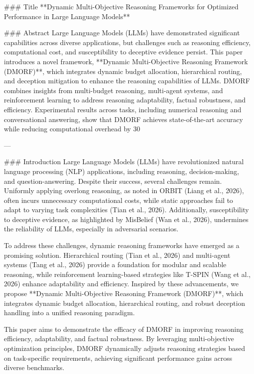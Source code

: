 ### Title
**Dynamic Multi-Objective Reasoning Frameworks for Optimized Performance in Large Language Models**

### Abstract
Large Language Models (LLMs) have demonstrated significant capabilities across diverse applications, but challenges such as reasoning efficiency, computational cost, and susceptibility to deceptive evidence persist. This paper introduces a novel framework, **Dynamic Multi-Objective Reasoning Framework (DMORF)**, which integrates dynamic budget allocation, hierarchical routing, and deception mitigation to enhance the reasoning capabilities of LLMs. DMORF combines insights from multi-budget reasoning, multi-agent systems, and reinforcement learning to address reasoning adaptability, factual robustness, and efficiency. Experimental results across tasks, including numerical reasoning and conversational answering, show that DMORF achieves state-of-the-art accuracy while reducing computational overhead by 30%

---

### Introduction
Large Language Models (LLMs) have revolutionized natural language processing (NLP) applications, including reasoning, decision-making, and question-answering. Despite their success, several challenges remain. Uniformly applying overlong reasoning, as noted in ORBIT (Liang et al., 2026), often incurs unnecessary computational costs, while static approaches fail to adapt to varying task complexities (Tian et al., 2026). Additionally, susceptibility to deceptive evidence, as highlighted by MisBelief (Wan et al., 2026), undermines the reliability of LLMs, especially in adversarial scenarios.

To address these challenges, dynamic reasoning frameworks have emerged as a promising solution. Hierarchical routing (Tian et al., 2026) and multi-agent systems (Tang et al., 2026) provide a foundation for modular and scalable reasoning, while reinforcement learning-based strategies like T-SPIN (Wang et al., 2026) enhance adaptability and efficiency. Inspired by these advancements, we propose **Dynamic Multi-Objective Reasoning Framework (DMORF)**, which integrates dynamic budget allocation, hierarchical routing, and robust deception handling into a unified reasoning paradigm.

This paper aims to demonstrate the efficacy of DMORF in improving reasoning efficiency, adaptability, and factual robustness. By leveraging multi-objective optimization principles, DMORF dynamically adjusts reasoning strategies based on task-specific requirements, achieving significant performance gains across diverse benchmarks.

